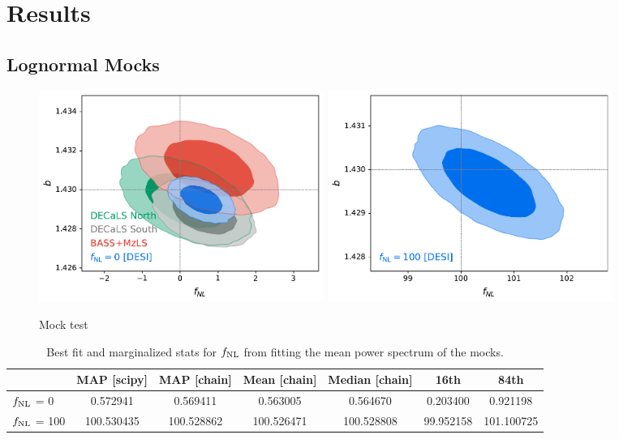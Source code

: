 \section{Results}\label{sec:results}


\subsection{Lognormal Mocks}

\begin{figure}
    \centering
    \includegraphics[width=0.45\textwidth]{figures/mcmc_zero.pdf} 
    \includegraphics[width=0.45\textwidth]{figures/mcmc_po100.pdf} 
    \caption{Mock test}\label{fig:mcmc_mocks}
\end{figure}


\begin{table}
  \begin{center}
    \caption{Best fit and marginalized stats for $f_{\rm NL}$ from fitting the mean power spectrum of the mocks.}
    \label{tab:mocksmcmc}
    \begin{tabular}{lcccccc}
    \hline
    \hline
    & MAP [scipy] & MAP [chain]  &	Mean [chain]	& Median [chain] &	16th	& 84th \\
    \hline
    $f_{\rm NL}$ = 0	& 0.572941	& 0.569411 &	0.563005&	0.564670&	0.203400&	0.921198 \\
    $f_{\rm NL}$ = 100	& 100.530435	& 100.528862 &	100.526471&	100.528808&	99.952158&	101.100725
    \end{tabular}
  \end{center}
\end{table}


